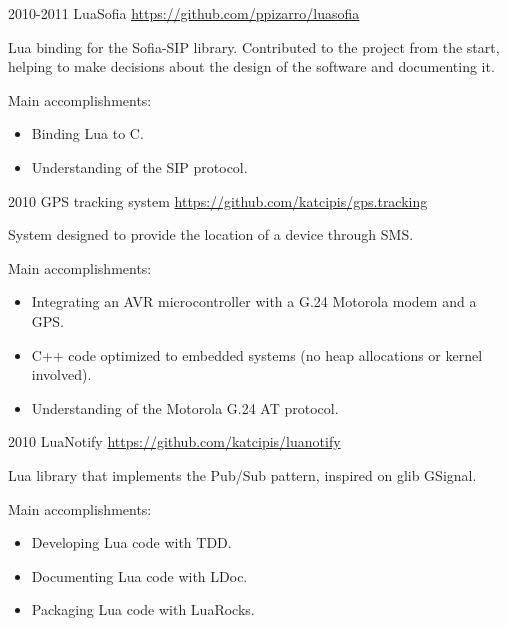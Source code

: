 \documentclass[]{friggeri-cv} %
\begin{document}
\begin{entrylist}
\entry
{2010-2011}
{LuaSofia}
{\href{https://github.com/ppizarro/luasofia}{https://github.com/ppizarro/luasofia}}
{

Lua binding for the Sofia-SIP library.
Contributed to the project from the start, helping to make decisions about the design of the software and documenting it.

Main accomplishments:\\
\begin{itemize}
\item Binding Lua to C.
\item Understanding of the SIP protocol.
\end{itemize}
}
\end{entrylist}

\begin{entrylist}
\entry
{2010}
{GPS tracking system}
{\href{https://github.com/katcipis/gps.tracking}{https://github.com/katcipis/gps.tracking}}
{

System designed to provide the location of a device through SMS. 

Main accomplishments:\\
\begin{itemize}
\item Integrating an AVR microcontroller with a G.24 Motorola modem and a GPS.
\item C++ code optimized to embedded systems (no heap allocations or kernel involved).
\item Understanding of the Motorola G.24 AT protocol.
\end{itemize}
}
\end{entrylist}

\begin{entrylist}
\entry
{2010}
{LuaNotify}
{\href{https://github.com/katcipis/luanotify}{https://github.com/katcipis/luanotify}}
{

Lua library that implements the Pub/Sub pattern, inspired on glib GSignal.

Main accomplishments:\\
\begin{itemize}
\item Developing Lua code with TDD.
\item Documenting Lua code with LDoc.
\item Packaging Lua code with LuaRocks.
\end{itemize}
}
\end{entrylist}
\pagebreak
\end{document}
